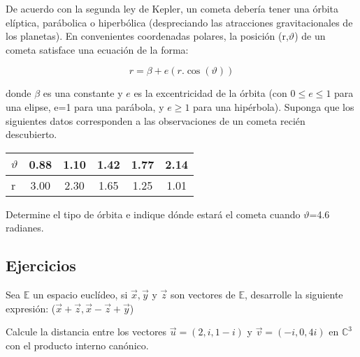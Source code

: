 {\begin{answers}
De acuerdo con la segunda ley de Kepler, un cometa debería tener una órbita elíptica, parábolica o hiperbólica (despreciando las atracciones gravitacionales de los planetas). En convenientes coordenadas polares, la posición (r,$\vartheta$) de un cometa satisface una ecuación de la forma:

$$r=\beta+ e(r.\cos(\vartheta))$$

\noindent
donde $\beta$ es una constante y $e$ es la excentricidad de la órbita (con $0\leq e \le 1$ para una elipse,
e=1 para una parábola, y $e\ge 1$ para una hipérbola).
Suponga que los siguientes datos corresponden a las observaciones de un cometa recién descubierto. 

\bigskip

\begin{table*}[ht]
	\centering
					\begin{tabular}{lccccc}
\hline\hline
$\vartheta$&0.88&1.10&1.42&1.77&2.14\\
\hline
r &3.00&2.30&1.65&1.25&1.01\\
		\end{tabular}
\end{table*}
Determine el tipo de órbita e indique dónde estará el cometa cuando $\vartheta$=4.6 radianes.

\bigskip

\end{answers}

\bigskip

 \subsection{Ejercicios}
 
 \bigskip
 
 
\begin{exercise}
\item
Sea $\mathbb{E}$ un espacio euclídeo, si $\vec{x},\vec{y}$ y $\vec{z}$ son vectores de $\mathbb{E}$, desarrolle la siguiente expresión: ($\vec{x} +\vec{z}, \vec{x}-\vec{z}+\vec{y}$)
\end{exercise}
\begin{exercise}
\item

Calcule la distancia entre los vectores $\vec{u}=(2,i,1-i)$ y $\vec{v}=(-i,0,4i)$ en  $\mathbb{C}^3$ con el producto interno canónico. 
\end{exercise}


}
